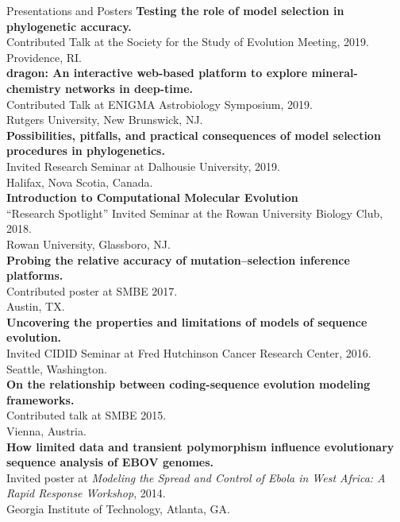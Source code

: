 \documentclass{resume} %
\begin{document}
\begin{rSection}{Presentations and Posters}
\textbf{Testing the role of model selection in phylogenetic accuracy.}
\\ Contributed Talk at the Society for the Study of Evolution Meeting, 2019.
\\ Providence, RI.\\

\textbf{dragon: An interactive web-based platform to explore mineral-chemistry networks in deep-time.}
\\ Contributed Talk at ENIGMA Astrobiology Symposium, 2019.
\\ Rutgers University, New Brunswick, NJ.\\


\textbf{Possibilities, pitfalls, and practical consequences of model selection procedures in phylogenetics.}
\\Invited Research Seminar at Dalhousie University, 2019.
\\ Halifax, Nova Scotia, Canada.\\

\textbf{Introduction to Computational Molecular Evolution}
\\``Research Spotlight'' Invited Seminar at the Rowan University Biology Club, 2018.
\\ Rowan University, Glassboro, NJ.\\

\textbf{Probing the relative accuracy of mutation--selection inference platforms.}
\\Contributed poster at SMBE 2017.
\\ Austin, TX.\\

\textbf{Uncovering the properties and limitations of models of sequence evolution.}
\\Invited CIDID Seminar at Fred Hutchinson Cancer Research Center, 2016.
\\ Seattle, Washington.\\

\textbf{On the relationship between coding-sequence evolution modeling frameworks.}
\\Contributed talk at SMBE 2015.
\\ Vienna, Austria.\\

\textbf{How limited data and transient polymorphism influence evolutionary sequence analysis of EBOV genomes.}
\\Invited poster at \emph{Modeling the Spread and Control of Ebola in West Africa: A Rapid Response Workshop}, 2014.
\\ Georgia Institute of Technology, Atlanta, GA.\\


\end{rSection}
\end{document}
